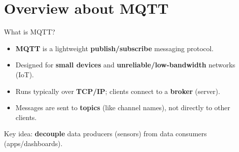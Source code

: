 ﻿\part{Overview about MQTT}

\begin{frame}{What is MQTT?}
  \begin{itemize}
    \item \textbf{MQTT} is a lightweight \textbf{publish/subscribe} messaging protocol.
    \item Designed for \textbf{small devices} and \textbf{unreliable/low-bandwidth} networks (IoT).
    \item Runs typically over \textbf{TCP/IP}; clients connect to a \textbf{broker} (server).
    \item Messages are sent to \textbf{topics} (like channel names), not directly to other clients.
  \end{itemize}

  \vspace{1ex}
  \footnotesize
  Key idea: \textbf{decouple} data producers (sensors) from data consumers (apps/dashboards).
\end{frame}
